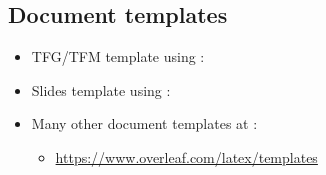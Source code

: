 \documentclass{beamer}
\begin{document}
\subsection*{Document templates}
\begin{frame}{\insertsubsection}
\begin{itemize}
  \item TFG/TFM template using :

\begin{center}
\end{center}

  \item Slides template using :

\begin{center}
\end{center}

\item Many other document templates at \wllogo{}:
\begin{itemize}
  \item \url{https://www.overleaf.com/latex/templates}
\end{itemize}

\end{itemize}
\end{frame}

\end{document}
